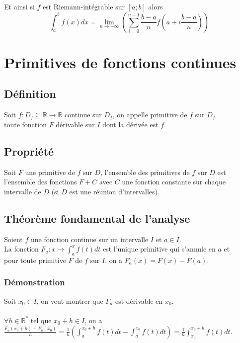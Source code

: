 \documentclass[a4paper,10pt]{book} %
\newcommand{\R}{\mathbb{R}}
\begin{document}
Et ainsi si $f$ est Riemann-intégrable sur $[a;b]$ alors 
$$\int_a^bf(x)dx=\lim\limits_{n\rightarrow +\infty}\left( \sum\limits_{i=0}^{n-1} \frac{b-a}{n}f(a+i\frac{b-a}{n}) \right)$$

\newpage

\section{Primitives de fonctions continues}
\subsection{Définition}
Soit $f : D_{f}\subseteq \R \rightarrow \R$ continue sur $D_f$, on appelle primitive de $f$ sur $D_f$\\
toute fonction $F$ dérivable sur $I$ dont la dérivée est $f$.

\subsection{Propriété}
Soit $F$ une primitive de $f$ sur $D$, l'ensemble des primitives de $f$ sur $D$ est l'ensemble des fonctions $F+C$ avec $C$ une fonction constante sur chaque intervalle de $D$ (si $D$ est une réunion d'intervalles).

\subsection{Théorème fondamental de l'analyse}
Soient $f$ une fonction continue sur un intervalle $I$ et $a\in I$.\\

La fonction $F_a:x\mapsto \displaystyle\int_a^xf(t)dt$ est l'unique primitive qui s'annule en $a$ et\\
pour toute primitive $F$ de $f$ sur $I$, on a $F_a(x)=F(x)-F(a)$.

\subsubsection{Démonstration}
Soit $x_0\in I$, on veut montrer que $F_a$ est dérivable en $x_0$.\\\\
$\forall h\in \R^*$ tel que $x_0+h\in I$, on a $\frac{F_a(x_0+h)-F_a(x_0)}{h}=\frac{1}{h}\left(\displaystyle\int_{a}^{x_0+h}f(t)dt-\displaystyle\int_{a}^{x_0}f(t)dt\right)=\frac{1}{h}\displaystyle\int_{x_0}^{x_0+h}f(t)dt$.\\\\
\end{document}
